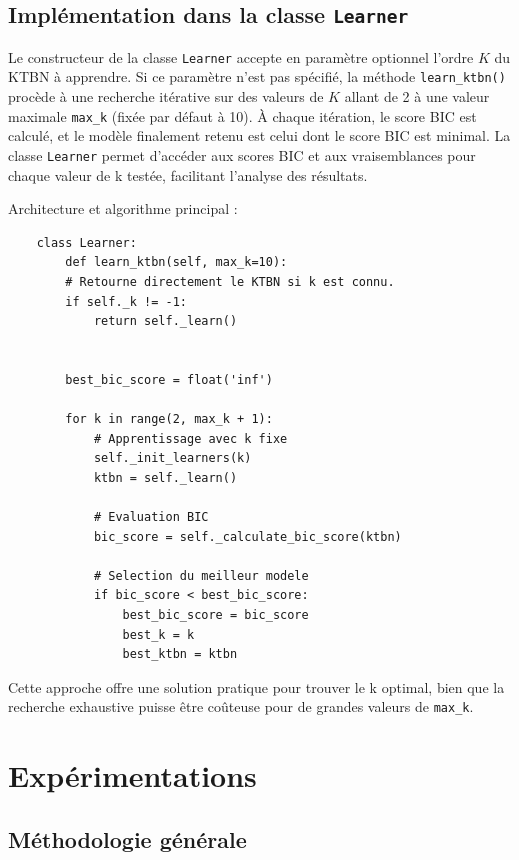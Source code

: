 \documentclass{article}
\begin{document}
\subsection{Implémentation dans la classe \texttt{Learner}}

Le constructeur de la classe \texttt{Learner} accepte en paramètre optionnel l'ordre $K$ du KTBN à apprendre.
Si ce paramètre n'est pas spécifié, la méthode \texttt{learn\_ktbn()} procède à une recherche itérative sur des
valeurs de $K$ allant de 2 à une valeur maximale \texttt{max\_k} (fixée par défaut à 10). À chaque itération,
le score BIC est calculé, et le modèle finalement retenu est celui dont le score BIC est minimal.  La classe
\texttt{Learner} permet d'accéder aux scores BIC et aux vraisemblances pour chaque valeur de k testée,
facilitant l'analyse des résultats.

Architecture et algorithme principal :

\begin{lstlisting}
    class Learner:
        def learn_ktbn(self, max_k=10):
        # Retourne directement le KTBN si k est connu.
        if self._k != -1:
            return self._learn()
        
        
        best_bic_score = float('inf')
        
        for k in range(2, max_k + 1):
            # Apprentissage avec k fixe
            self._init_learners(k)
            ktbn = self._learn()
            
            # Evaluation BIC
            bic_score = self._calculate_bic_score(ktbn)
            
            # Selection du meilleur modele
            if bic_score < best_bic_score:
                best_bic_score = bic_score
                best_k = k
                best_ktbn = ktbn
\end{lstlisting}


Cette approche offre une solution pratique pour trouver le k optimal, bien que la recherche exhaustive puisse
être coûteuse pour de grandes valeurs de \texttt{max\_k}.

\section{Expérimentations}

\subsection{Méthodologie générale}
\end{document}
